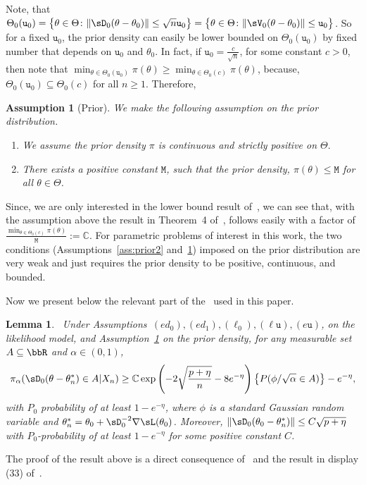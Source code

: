 \documentclass[11pt]{article}
\newtheorem{lemma}[theorem]{Lemma}
\newtheorem{assumption}{Assumption}[section]
\begin{document}
Note, that $\Theta_0(\mathtt{u}_0)= \big\{\theta \in \Theta \colon \|\sD_0(\theta - \theta_0)\| \le \sqrt{n} \mathtt{u}_0 \big\}= \big\{\theta \in \Theta \colon \|\sV_0(\theta - \theta_0)\| \le \mathtt{u}_0 \big\} $. So for a fixed $\mathtt{u}_0$, the prior density can easily be lower bounded on $\Theta_0(\mathtt{u}_0)$ by fixed number that depends on $\mathtt{u}_0$ and $\theta_0$. In fact, if $\mathtt{u}_0 =  \frac{c}{\sqrt{n}}$, for some constant $c>0$, then note that  $\min_{\theta\in \Theta_0(\mathtt{u}_0) } \pi(\theta)\geq \min_{\theta\in \Theta_0(c) } \pi(\theta)$, because, $\Theta_0(\mathtt{u}_0) \subseteq \Theta_0(c)$ for all $n\geq 1$. Therefore,

\begin{assumption}[Prior]
\label{Ass:Prior2}
We make the following assumption on the prior distribution.
    \begin{enumerate}
        \item We assume the prior density $\pi$ is continuous and strictly positive on $\Theta.$
        \item There exists a positive constant $\mathtt{M}$, such that the prior density, $\pi(\theta)\leq \mathtt{M}$ for all $\theta \in \Theta$.
       
    \end{enumerate}
\end{assumption}

Since, we are only interested in the lower bound result of~\cite{Panov2015}, we can see that, with the assumption above the result in Theorem~4 of~\cite{Panov2015}, follows easily with a factor of $\frac{\min_{\theta\in \Theta_0(c) } \pi(\theta)}{\mathtt{M}} := \mathbb{C}$. For parametric problems of interest in this work, the two conditions (Assumptions~\ref{ass:prior2} and~\ref{Ass:Prior2}) imposed on the prior distribution are very weak and just requires the prior density to be positive, continuous, and bounded.

Now we present below the relevant part of the~\cite[Theorem 4]{Panov2015} used in this paper.

\begin{lemma}~\label{lem:FBVM}
    Under Assumptions~$(e\!d_0),(e\!d_1),(\ell_0),(\ell\mathtt{u}), (e\mathtt{u})$, on the likelihood model, and Assumption~\ref{Ass:Prior2} on the prior density, for any measurable set $A\subseteq \bbR$ and $\alpha\in(0,1)$,
    \begin{align}
        \pi_{\alpha}(\sD_0(\theta- \theta_n^*)\in A|X_n) \geq \mathbb{C}\exp\left(-2\sqrt{\frac{p+ \eta}{n}} - 8e^{-\eta}\right) \left\{P(\phi/\sqrt{\alpha} \in A)  \right\} -e^{-\eta}, 
    \end{align}
    with $P_0$ probability of at least $1-e^{-\eta}$, where $\phi$ is a standard Gaussian random variable and $\theta_n^* = \theta_0 + \sD_0^{-2} \nabla\sL(\theta_0)$. Moreover, $\|\sD_0(\theta_0-\theta_n^*)\|\leq {C\sqrt{p+\eta}}$ with $P_0$-probability of at least $1-e^{-\eta}$ for some positive constant $C$.
\end{lemma}
The proof of the result above is a direct consequence of~\cite[Theorem 4]{Panov2015} and the result in display (33) of~\cite[Theorem 9]{Panov2015}.
\end{document}
